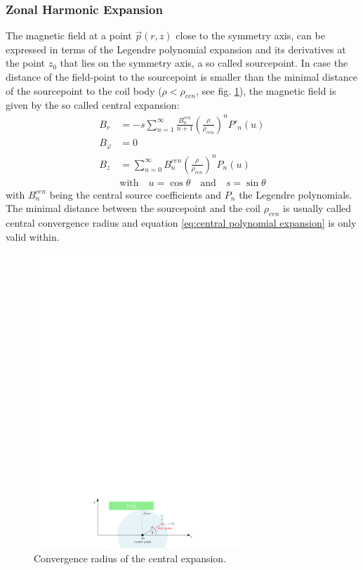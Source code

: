       \subsubsection{Zonal Harmonic Expansion}
	The magnetic field at a point $\vec{p}(r,z)$ close to the symmetry axis, can be expressed in terms of the Legendre polynomial expansion and its derivatives at the point $z_0$ that lies on the symmetry axis, a so called sourcepoint. In case the distance of the field-point to the sourcepoint is smaller than the minimal distance of the sourcepoint to the coil body ($\rho < \rho_{cen}$, see fig. \ref{fig:central convergence radius}), the magnetic field is given by the so called central expansion:
	\begin{equation}
		\begin{aligned}
			B_r &= -s\sum_{n=1}^{\infty} \frac{B_{n}^{cen}}{n+1} \left(\frac{\rho}{\rho_{cen}}\right)^{n}P'_n(u) \\
			B_{\varphi} &= 0 \\
			B_z &= \sum_{n=0}^{\infty} B_{n}^{cen}\left(\frac{\rho}{\rho_{cen}}\right)^{n}P_n(u) \\
			&\text{with} \quad u = \cos\theta \quad \text{and} \quad s = \sin\theta
		\end{aligned}
		\label{eq:central polynomial expansion}
	\end{equation}
	with $B_{n}^{cen}$ being the central source coefficients and $P_{n}$ the Legendre polynomials. The minimal distance between the sourcepoint and the coil $\rho_{cen}$ is usually called central convergence radius and equation \eqref{eq:central polynomial expansion} is only valid within.
	  \begin{figure}[h]
		\centering \includegraphics[width=0.7\textwidth]{images/KAFCAFigures/legendre_central.pdf}
		\caption{Convergence radius of the central expansion.}
		\label{fig:central convergence radius}
	  \end{figure}
